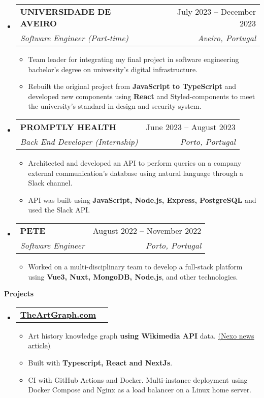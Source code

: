 \documentclass[letterpaper,12pt]{article}[leftmargin=*]
\makeatletter
\def \entryspacing {-4pt}
\renewcommand{\section}[2]{\vspace{5pt}
  \colorbox{secondary}{\color{white}\raggedbottom\normalsize\textbf{{#1}{\hspace{7pt}#2}}}
}
\newcommand{\resumeEntryStart}{\begin{itemize}[leftmargin=2.5mm]}
\newcommand{\resumeEntryEnd}{\end{itemize}\vspace{\entryspacing}}
\newcommand{\resumeItemListStart}{\begin{itemize}[leftmargin=4.5mm]}
\newcommand{\resumeItemListEnd}{\end{itemize}}
\newcommand{\resumeItem}[1]{
  \item\small{
    {#1 \vspace{-2pt}}
  }
}
\newcommand{\resumeEntryTSDL}[4]{
  \vspace{-1pt}\item[]
    \begin{tabularx}{0.97\textwidth}{X@{\hspace{60pt}}r}
      \textbf{\color{primary}#1} & {\firabook\color{accent}\small#2} \\
      \textit{\color{accent}\small#3} & \textit{\color{accent}\small#4} \\
    \end{tabularx}\vspace{-6pt}
}
\newcommand{\resumeEntryTD}[2]{
  \vspace{-1pt}\item[]
    \begin{tabularx}{0.97\textwidth}{X@{\hspace{60pt}}r}
      \textbf{\color{primary}#1} & {\firabook\color{accent}\small#2} \\
    \end{tabularx}\vspace{-6pt}
}
\makeatother
\begin{document}
  \resumeEntryStart
    \resumeEntryTSDL
      {UNIVERSIDADE DE AVEIRO}{July 2023 -- December 2023}
      {Software Engineer (Part-time)}{Aveiro, Portugal}
    \resumeItemListStart
      \resumeItem {Team leader for integrating my final project in software engineering bachelor's degree on university's digital infrastructure.}
      \resumeItem {Rebuilt the original project from \textbf{JavaScript to TypeScript} and developed new components using \textbf{React} and Styled-components to meet the university's standard in design and security system.}
    \resumeItemListEnd
  \resumeEntryEnd

  \resumeEntryStart
    \resumeEntryTSDL
      {PROMPTLY HEALTH}{June 2023 -- August 2023}
      {Back End Developer (Internship)}{Porto, Portugal}
    \resumeItemListStart
      \resumeItem {Architected and developed an API to perform queries on a company external communication's database using natural language through a Slack channel.}
      \resumeItem {API was built using \textbf{JavaScript, Node.js, Express, PostgreSQL} and used the Slack API.}
    \resumeItemListEnd
  \resumeEntryEnd

  \resumeEntryStart
    \resumeEntryTSDL
      {PETE}{August 2022 -- November 2022}
      {Software Engineer}{Porto, Portugal}
    \resumeItemListStart
      \resumeItem {Worked on a multi-disciplinary team to develop a full-stack platform using \textbf{Vue3, Nuxt, MongoDB, Node.js}, and other technologies.}
    \resumeItemListEnd
  \resumeEntryEnd
\section{\faFlask}{Projects}

  \resumeEntryStart
    \resumeEntryTD
      {\href{https://TheArtGraph.com}{TheArtGraph.com}}{}
    \resumeItemListStart
      \resumeItem {Art history knowledge graph \textbf{using Wikimedia API} data. {\underline{\href{https://www.nexojornal.com.br/expresso/2025/04/11/arte-movimentos-artisticos-grafico-site-theartgraph}{(Nexo news article)}}}}
      \resumeItem {Built with \textbf{Typescript, React and NextJs}.}
      \resumeItem {CI with GitHub Actions and Docker. Multi-instance deployment using Docker Compose and Nginx as a load balancer on a Linux home server.}
    \resumeItemListEnd
  \resumeEntryEnd

\end{document}
